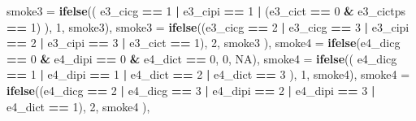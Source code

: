 \documentclass[]{book}
\newenvironment{Shaded}{\begin{snugshade}}{\end{snugshade}}
\newcommand{\DataTypeTok}[1]{\textcolor[rgb]{0.13,0.29,0.53}{#1}}
\newcommand{\DecValTok}[1]{\textcolor[rgb]{0.00,0.00,0.81}{#1}}
\newcommand{\KeywordTok}[1]{\textcolor[rgb]{0.13,0.29,0.53}{\textbf{#1}}}
\newcommand{\NormalTok}[1]{#1}
\newcommand{\OperatorTok}[1]{\textcolor[rgb]{0.81,0.36,0.00}{\textbf{#1}}}
\newcommand{\OtherTok}[1]{\textcolor[rgb]{0.56,0.35,0.01}{#1}}
\newcommand{\StringTok}[1]{\textcolor[rgb]{0.31,0.60,0.02}{#1}}
\begin{document}
\begin{Shaded}
\begin{Highlighting}[]
{    \DataTypeTok{smoke3 =} \KeywordTok{ifelse}\NormalTok{((}
\NormalTok{      e3_cicg }\OperatorTok{==}\StringTok{ }\DecValTok{1} \OperatorTok{|}
\StringTok{        }\NormalTok{e3_cipi }\OperatorTok{==}\StringTok{ }\DecValTok{1} \OperatorTok{|}\StringTok{ }\NormalTok{(e3_cict }\OperatorTok{==}\StringTok{ }\DecValTok{0} \OperatorTok{&}\StringTok{ }\NormalTok{e3_cictps }\OperatorTok{==}\StringTok{ }\DecValTok{1}\NormalTok{)}
\NormalTok{    ), }\DecValTok{1}\NormalTok{, smoke3),}
    \DataTypeTok{smoke3 =} \KeywordTok{ifelse}\NormalTok{((e3_cicg }\OperatorTok{==}\StringTok{ }\DecValTok{2} \OperatorTok{|}
\StringTok{                       }\NormalTok{e3_cicg }\OperatorTok{==}\StringTok{ }\DecValTok{3} \OperatorTok{|}
\StringTok{                       }\NormalTok{e3_cipi }\OperatorTok{==}\StringTok{ }\DecValTok{2} \OperatorTok{|}\StringTok{ }\NormalTok{e3_cipi }\OperatorTok{==}\StringTok{ }\DecValTok{3} \OperatorTok{|}\StringTok{ }\NormalTok{e3_cict }\OperatorTok{==}\StringTok{ }\DecValTok{1}\NormalTok{),}
                    \DecValTok{2}\NormalTok{,}
\NormalTok{                    smoke3}
\NormalTok{    ),}
    \DataTypeTok{smoke4 =} \KeywordTok{ifelse}\NormalTok{(e4_dicg }\OperatorTok{==}\StringTok{ }\DecValTok{0} \OperatorTok{&}
\StringTok{                      }\NormalTok{e4_dipi }\OperatorTok{==}\StringTok{ }\DecValTok{0} \OperatorTok{&}\StringTok{ }\NormalTok{e4_dict }\OperatorTok{==}\StringTok{ }\DecValTok{0}\NormalTok{, }\DecValTok{0}\NormalTok{, }\OtherTok{NA}\NormalTok{),}
    \DataTypeTok{smoke4 =} \KeywordTok{ifelse}\NormalTok{((}
\NormalTok{      e4_dicg }\OperatorTok{==}\StringTok{ }\DecValTok{1} \OperatorTok{|}
\StringTok{        }\NormalTok{e4_dipi }\OperatorTok{==}\StringTok{ }\DecValTok{1} \OperatorTok{|}\StringTok{ }\NormalTok{e4_dict }\OperatorTok{==}\StringTok{ }\DecValTok{2} \OperatorTok{|}\StringTok{ }\NormalTok{e4_dict }\OperatorTok{==}\StringTok{ }\DecValTok{3}
\NormalTok{    ), }\DecValTok{1}\NormalTok{, smoke4),}
    \DataTypeTok{smoke4 =} \KeywordTok{ifelse}\NormalTok{((e4_dicg }\OperatorTok{==}\StringTok{ }\DecValTok{2} \OperatorTok{|}
\StringTok{                       }\NormalTok{e4_dicg }\OperatorTok{==}\StringTok{ }\DecValTok{3} \OperatorTok{|}
\StringTok{                       }\NormalTok{e4_dipi }\OperatorTok{==}\StringTok{ }\DecValTok{2} \OperatorTok{|}\StringTok{ }\NormalTok{e4_dipi }\OperatorTok{==}\StringTok{ }\DecValTok{3} \OperatorTok{|}\StringTok{ }\NormalTok{e4_dict }\OperatorTok{==}\StringTok{ }\DecValTok{1}\NormalTok{),}
                    \DecValTok{2}\NormalTok{,}
\NormalTok{                    smoke4}
\NormalTok{    ),}
}
\end{Highlighting}
\end{Shaded}
\end{document}

